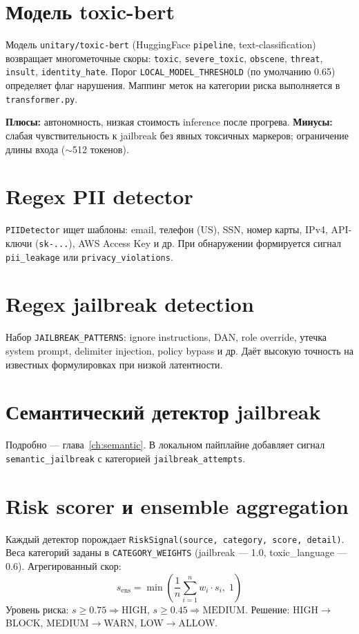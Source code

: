 \documentclass[12pt,a4paper]{report}
\begin{document}
\section{Модель toxic-bert}

Модель \texttt{unitary/toxic-bert} (HuggingFace \texttt{pipeline}, text-classification)
возвращает многометочные скоры: \texttt{toxic}, \texttt{severe\_toxic}, \texttt{obscene},
\texttt{threat}, \texttt{insult}, \texttt{identity\_hate}.
Порог \texttt{LOCAL\_MODEL\_THRESHOLD} (по умолчанию 0.65) определяет флаг нарушения.
Маппинг меток на категории риска выполняется в \texttt{transformer.py}.

\textbf{Плюсы:} автономность, низкая стоимость inference после прогрева.
\textbf{Минусы:} слабая чувствительность к jailbreak без явных токсичных маркеров;
ограничение длины входа ($\sim$512 токенов).

\section{Regex PII detector}

\texttt{PIIDetector} ищет шаблоны: email, телефон (US), SSN, номер карты, IPv4,
API-ключи (\texttt{sk-...}), AWS Access Key и др.
При обнаружении формируется сигнал \texttt{pii\_leakage} или \texttt{privacy\_violations}.

\section{Regex jailbreak detection}

Набор \texttt{JAILBREAK\_PATTERNS}: ignore instructions, DAN, role override,
утечка system prompt, delimiter injection, policy bypass и др.
Даёт высокую точность на известных формулировках при низкой латентности.

\section{Семантический детектор jailbreak}

Подробно --- глава~\ref{ch:semantic}. В локальном пайплайне добавляет сигнал
\texttt{semantic\_jailbreak} с категорией \texttt{jailbreak\_attempts}.

\section{Risk scorer и ensemble aggregation}

Каждый детектор порождает \texttt{RiskSignal(source, category, score, detail)}.
Веса категорий заданы в \texttt{CATEGORY\_WEIGHTS} (jailbreak --- 1.0, toxic\_language --- 0.6).
Агрегированный скор:
\[
s_{\mathrm{ens}} = \min\left(\frac{1}{n}\sum_{i=1}^{n} w_i \cdot s_i,\; 1\right)
\]
Уровень риска: $s \geq 0.75 \Rightarrow \mathrm{HIGH}$, $s \geq 0.45 \Rightarrow \mathrm{MEDIUM}$.
Решение: HIGH$\to$BLOCK, MEDIUM$\to$WARN, LOW$\to$ALLOW.
\end{document}
